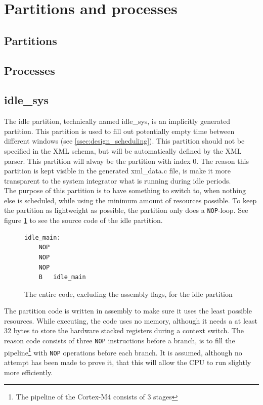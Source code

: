 \section{Partitions and processes}

\subsection{Partitions}

\subsection{Processes}

\subsection{idle\_sys}
\label{ssec:idle_part}
The idle partition, technically named idle\_sys, is an implicitly generated
partition. This partition is used to fill out potentially empty time between
different windows (see \ref{ssec:design_scheduling}). This partition should not
be specified in the XML schema, but will be automatically defined by the XML
parser. This partition will alway be the partition with index 0. The reason this
partition is kept visible in the generated xml\_data.c file, is make it more
transparent to the system integrator what is running during idle periods.\\

The purpose of this partition is to have something to switch to, when nothing
else is scheduled, while using the minimum amount of resources possible.
To keep the partition as lightweight as possible, the partition only does a
\texttt{NOP}-loop. See figure \ref{fig:idle_src} to see the source code of the
idle partition.\\
\begin{figure}
	\begin{lstlisting}
idle_main:
	NOP
	NOP
	NOP
	B   idle_main
	\end{lstlisting}
	\caption{The entire code, excluding the assembly flags, for the idle partition}
	\label{fig:idle_src}
\end{figure}
The partition code is written in assembly to make sure it uses the least possible
resources. While executing, the code uses no memory, although it needs a at
least 32 bytes to store the hardware stacked registers during a context switch.
The reason code consists of three \texttt{NOP} instructions before a branch, is
to fill the pipeline\footnote{The pipeline of the Cortex-M4 consists of 3 stages}
with \texttt{NOP} operations before each branch. It is assumed, although no
attempt has been made to prove it, that this will allow the CPU to run slightly
more efficiently.


